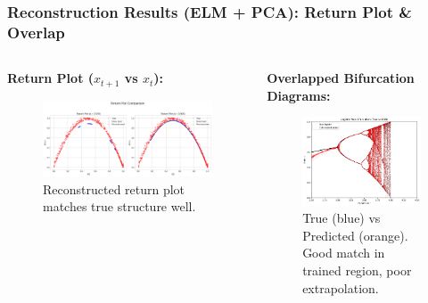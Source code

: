 \documentclass{beamer}
\begin{document}
\begin{frame}
    \frametitle{Reconstruction Results (ELM + PCA): Return Plot & Overlap}
    \begin{columns}[T]
        \begin{column}{0.5\textwidth}
            \textbf{Return Plot ($x_{t+1}$ vs $x_t$):}
            \begin{figure}
                \includegraphics[width=\linewidth]{figures/bd_return_plot_2.png}
                \caption{Reconstructed return plot matches true structure well.}
                 \label{fig:bd_2_slide}
            \end{figure}
        \end{column}
        \begin{column}{0.5\textwidth}
            \textbf{Overlapped Bifurcation Diagrams:}
             \begin{figure}
                \includegraphics[width=\linewidth]{figures/bf_3_results_overlapped.png}
                \caption{True (blue) vs Predicted (orange). Good match in trained region, poor extrapolation.}
                 \label{fig:bd_3_slide}
            \end{figure}
        \end{column}
    \end{columns}
\end{frame}
\end{document}
